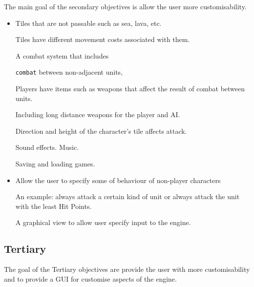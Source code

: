 The main goal of the secondary objectives is allow the user more customisability. 
\begin{itemize}
	\tick Tiles have \texttt{height}, where units can only move to tiles of a smilier height.
	\item Tiles that are not passable such as sea, lava, etc.
	
	\tick Tiles have different movement costs associated with them.
	
	\tick A combat system that includes 
	\begin{itemize}
		\tick \texttt{combat} between non-adjacent units,
	\end{itemize}
	
	\tick Players have items such as weapons that affect the result of combat between units. 
	\begin{itemize}
		\tick Including long distance weapons for the player and AI.
	\end{itemize}
	
	\cross Direction and height of the character's tile affects attack.
	
	\tick Sound effects.
	\tick Music.
	
	\cross Saving and loading games.
	
	\item Allow the user to specify some of behaviour of non-player characters
	\begin{itemize}
		\cross An example: always attack a certain kind of unit or always attack the unit with the least Hit Points.
	\end{itemize}
	
	\tick A graphical view to allow user specify input to the engine.
\end{itemize}

\subsection{Tertiary} 
\label{tertiary}
The goal of the Tertiary objectives are provide the user with more customisability and to provide a GUI for customise aspects of the engine. 

